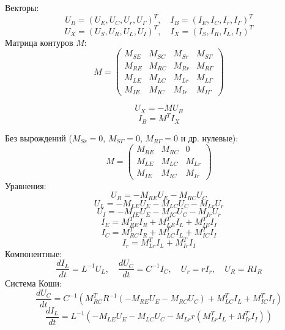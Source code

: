 	Векторы:
	\[
	U_B = (U_E, U_C, U_r, U_\Gamma)^T, \quad I_B = (I_E, I_C, I_r, I_\Gamma)^T
	\]
	\[
	U_X = (U_S, U_R, U_L, U_I)^T, \quad I_X = (I_S, I_R, I_L, I_I)^T
	\]
	Матрица контуров $M$:
	\[
	M = \begin{pmatrix}
		M_{SE} & M_{SC} & M_{Sr} & M_{S\Gamma} \\
		M_{RE} & M_{RC} & M_{Rr} & M_{R\Gamma} \\
		M_{LE} & M_{LC} & M_{Lr} & M_{L\Gamma} \\
		M_{IE} & M_{IC} & M_{Ir} & M_{I\Gamma}
	\end{pmatrix}
	\]
	
	\begin{equation}
		U_X = -M U_B
	\end{equation}
	\begin{equation}
		I_B = M^T I_X
	\end{equation}
	
	Без вырождений ($M_{Sr} = 0$, $M_{S\Gamma} = 0$, $M_{R\Gamma} = 0$ и др. нулевые):
	\[
	M = \begin{pmatrix}
		M_{RE} & M_{RC} & 0 \\
		M_{LE} & M_{LC} & M_{Lr} \\
		M_{IE} & M_{IC} & M_{Ir}
	\end{pmatrix}
	\]
	Уравнения:
	\begin{equation}
		U_R = -M_{RE} U_E - M_{RC} U_C
	\end{equation}
	\begin{equation}
		U_L = -M_{LE} U_E - M_{LC} U_C - M_{Lr} U_r
	\end{equation}
	\begin{equation}
		U_I = -M_{IE} U_E - M_{IC} U_C - M_{Ir} U_r
	\end{equation}
	\begin{equation}
		I_E = M_{RE}^T I_R + M_{LE}^T I_L + M_{IE}^T I_I
	\end{equation}
	\begin{equation}
		I_C = M_{RC}^T I_R + M_{LC}^T I_L + M_{IC}^T I_I
	\end{equation}
	\begin{equation}
		I_r = M_{Lr}^T I_L + M_{Ir}^T I_I
	\end{equation}
	Компонентные:
	\begin{equation}
		\frac{d I_L}{dt} = L^{-1} U_L, \quad \frac{d U_C}{dt} = C^{-1} I_C, \quad U_r = r I_r, \quad U_R = R I_R
	\end{equation}
	Система Коши:
	\begin{equation}
		\frac{d U_C}{dt} = C^{-1} (M_{RC}^T R^{-1} (-M_{RE} U_E - M_{RC} U_C) + M_{LC}^T I_L + M_{IC}^T I_I)
	\end{equation}
	\begin{equation}
		\frac{d I_L}{dt} = L^{-1} (-M_{LE} U_E - M_{LC} U_C - M_{Lr} r (M_{Lr}^T I_L + M_{Ir}^T I_I))
	\end{equation}
	
